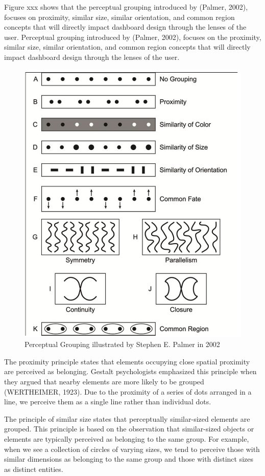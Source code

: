 \documentclass[print]{nuthesis}
\begin{document}
Figure xxx shows that the perceptual grouping introduced by (Palmer, 2002), focuses on proximity, similar size, similar orientation, and common region concepts that will directly impact dashboard design through the lenses of the user.
Perceptual grouping introduced by (Palmer, 2002), focuses on the proximity, similar size, similar orientation, and common region concepts that will directly impact dashboard design through the lenses of the user.

\begin{figure}

{\centering \includegraphics[width=0.55\linewidth]{figure/Perceptual_grouping} 

}

\caption{Perceptual Grouping illustrated by Stephen E. Palmer in 2002}\label{fig:perceptualgrouping}
\end{figure}

The proximity principle states that elements occupying close spatial proximity are perceived as belonging.
Gestalt psychologists emphasized this principle when they argued that nearby elements are more likely to be grouped (WERTHEIMER, 1923).
Due to the proximity of a series of dots arranged in a line, we perceive them as a single line rather than individual dots.

The principle of similar size states that perceptually similar-sized elements are grouped.
This principle is based on the observation that similar-sized objects or elements are typically perceived as belonging to the same group.
For example, when we see a collection of circles of varying sizes, we tend to perceive those with similar dimensions as belonging to the same group and those with distinct sizes as distinct entities.
\end{document}
